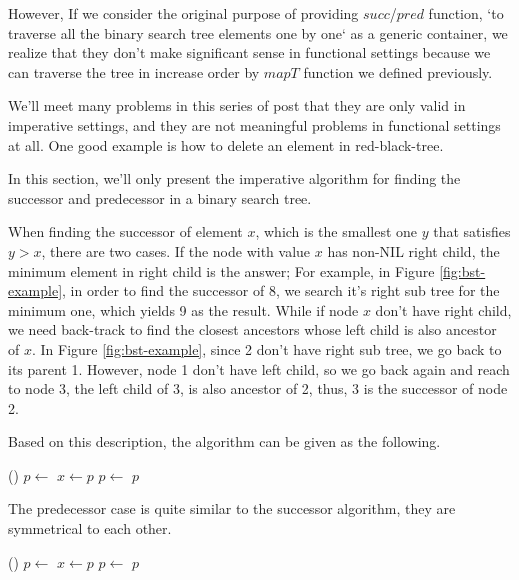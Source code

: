 \documentclass{article}
\begin{document}
However, If we consider
the original purpose of providing $succ$/$pred$ function, `to traverse all the
binary search tree elements one by one` as a generic container, we realize
that they don't make significant sense in functional settings because
we can traverse the tree in increase order by $mapT$ function we defined
previously.

We'll meet many problems in this series of post that they are only valid
in imperative settings, and they are not meaningful problems in functional
settings at all. One good example is how to delete an element in
red-black-tree\cite{okasaki-blog}.

In this section, we'll only present the imperative algorithm for finding
the successor and predecessor in a binary search tree.

When finding the successor of element $x$, which is the smallest one $y$
that satisfies $y > x$, there are two cases. If the node with value $x$
has non-NIL right child, the minimum element in right child is the answer;
For example, in Figure \ref{fig:bst-example}, in order to find the successor
of 8, we search it's right sub tree for the minimum one, which yields 9
as the result. While if node $x$ don't have right child, we need
back-track to find the closest ancestors whose left child is also ancestor
of $x$. In Figure \ref{fig:bst-example}, since 2 don't have right sub tree,
we go back to its parent 1. However, node 1 don't have left child, so we
go back again and reach to node 3, the left child of 3, is also ancestor
of 2, thus, 3 is the successor of node 2.

Based on this description, the algorithm can be given as the following.

\begin{algorithmic}[1]
    \State \Return {}()
  \Else
    \State $p \gets $ 
      \State $x \gets p$
      \State $p \gets $ 
    \EndWhile
    \State \Return $p$
  \EndIf
\EndFunction
\end{algorithmic}

The predecessor case is quite similar to the successor algorithm, they
are symmetrical to each other.

\begin{algorithmic}[1]
    \State \Return {}()
  \Else
    \State $p \gets $ 
      \State $x \gets p$
      \State $p \gets $ 
    \EndWhile
    \State \Return $p$
  \EndIf
\EndFunction
\end{algorithmic}
\end{document}
